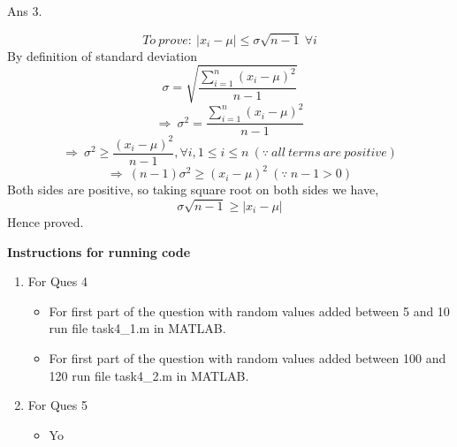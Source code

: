 \documentclass[11pt]{article}
\begin{document}
Ans 3.\begin{center}
$$To\ prove:\ |x_i - \mu| \le \sigma\sqrt{n-1}\ \forall i$$ \newline
By definition of standard deviation
$$\sigma = \sqrt{\frac{\sum\limits_{i=1}^n(x_i-\mu)^2}{n-1}}$$
$$\Rightarrow\ \sigma^2=\frac{\sum\limits_{i=1}^n(x_i-\mu)^2}{n-1}$$
$$\Rightarrow\ \sigma^2\ge\frac{(x_i-\mu)^2}{n-1}, \forall i,1\le i\le n\ (\because\ all\ terms\ are\ positive)$$
$$\Rightarrow\ (n-1)\sigma^2 \ge (x_i-\mu)^2\ (\because\ n-1 > 0)$$
Both sides are positive, so taking square root on both sides we have,
$$\sigma\sqrt{n-1} \ge |x_i-\mu|$$
Hence proved.

\vspace{50px}

\textbf{Instructions for running code}
\begin{enumerate}
\item For Ques 4
\begin{itemize}
\item For first part of the question with random values added between 5 and 10 run file task4\_1.m in MATLAB.
\item For first part of the question with random values added between 100 and 120 run file task4\_2.m in MATLAB.
\end{itemize}
\item For Ques 5
\begin{itemize}
\item Yo
\end{itemize}
\end{enumerate}
\end{center}
\end{document}
